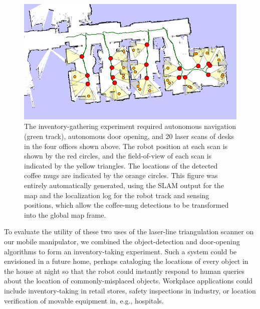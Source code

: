 \documentclass[letterpaper, 10 pt, conference]{ieeeconf}  %
\begin{document}
\begin{figure}[t]
\begin{center}
  \includegraphics[width=6in]{inventorybot.png}
\end{center}
\caption{The inventory-gathering experiment required autonomous navigation (green track), autonomous door opening, and 20 laser scans of desks in the four offices shown above. The robot position at each scan is shown by the red circles, and the field-of-view of each scan is indicated by the yellow triangles. The
locations of the detected coffee mugs are indicated by the orange circles. This
figure was entirely automatically generated, using the SLAM output for the map
and the localization log for the robot track and sensing positions, which allow
the coffee-mug detections to be transformed into the global map frame.}
\label{fig:mugs_found}
\end{figure}

To evaluate the utility of these two uses of the laser-line triangulation
scanner on our mobile manipulator, we combined the object-detection and 
door-opening algorithms to form an inventory-taking experiment. Such a system
could be envisioned in a future home, perhaps cataloging the locations of
every object in the house at night so that the robot could instantly respond
to human queries about the location of commonly-misplaced objects. Workplace
applications could include inventory-taking in retail stores, safety inspections
in industry, or location verification of movable equipment in, e.g., hospitals.
\end{document}
